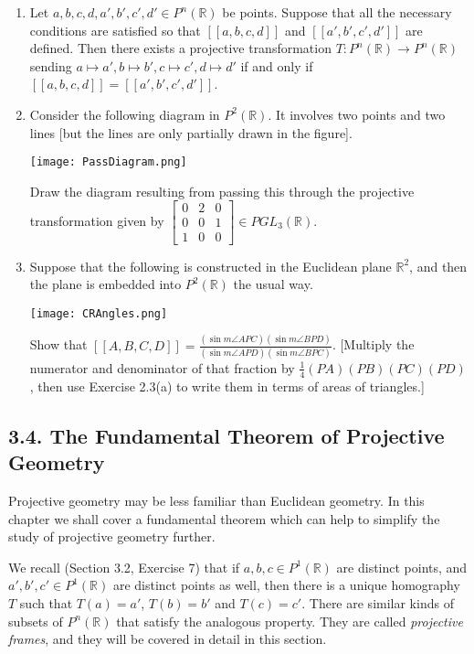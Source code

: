 \documentclass[leqno]{book}
\begin{document}
\begin{enumerate}
\item Let $a,b,c,d,a',b',c',d'\in P^n(\mathbb R)$ be points.  Suppose that all the necessary conditions are satisfied so that $[\![a,b,c,d]\!]$ and $[\![a',b',c',d']\!]$ are defined.  Then there exists a projective transformation $T:P^n(\mathbb R)\to P^n(\mathbb R)$ sending $a\mapsto a',b\mapsto b',c\mapsto c',d\mapsto d'$ if and only if $[\![a,b,c,d]\!]=[\![a',b',c',d']\!]$.

\item Consider the following diagram in $P^2(\mathbb R)$.  It involves two points and two lines [but the lines are only partially drawn in the figure].
\begin{center}\texttt{[image: PassDiagram.png]}\end{center}
Draw the diagram resulting from passing this through the projective transformation given by $\begin{bmatrix}0&2&0\\0&0&1\\1&0&0\end{bmatrix}\in PGL_3(\mathbb R)$.

\item Suppose that the following is constructed in the Euclidean plane $\mathbb R^2$, and then the plane is embedded into $P^2(\mathbb R)$ the usual way.
\begin{center}\texttt{[image: CRAngles.png]}\end{center}
Show that $[\![A,B,C,D]\!]=\frac{(\sin m\angle APC)(\sin m\angle BPD)}{(\sin m\angle APD)(\sin m\angle BPC)}$.  [Multiply the numerator and denominator of that fraction by $\frac 14(PA)(PB)(PC)(PD)$, then use Exercise 2.3(a) to write them in terms of areas of triangles.]
\end{enumerate}

\subsection*{3.4. The Fundamental Theorem of Projective Geometry}
Projective geometry may be less familiar than Euclidean geometry.  In this chapter we shall cover a fundamental theorem which can help to simplify the study of projective geometry further.

We recall (Section 3.2, Exercise 7) that if $a,b,c\in P^1(\mathbb R)$ are distinct points, and $a',b',c'\in P^1(\mathbb R)$ are distinct points as well, then there is a unique homography $T$ such that $T(a)=a'$, $T(b)=b'$ and $T(c)=c'$.  There are similar kinds of subsets of $P^n(\mathbb R)$ that satisfy the analogous property.  They are called \emph{projective frames}, and they will be covered in detail in this section.
\end{document}
